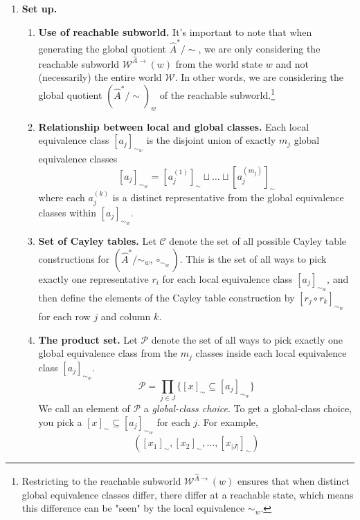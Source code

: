 \begin{proofE}
\begin{enumerate}[(1)]
    \item \textbf{Set up.}
    \begin{enumerate}
        \item \textbf{Use of reachable subworld.}
        It's important to note that when generating the global quotient $\hat{A}^{*}/\sim$, we are only considering the reachable subworld $\mathscr{W}^{\hat{A}\to}(w)$ from the world state $w$ and not (necessarily) the entire world $\mathscr{W}$.
        In other words, we are considering the global quotient $(\hat{A}^{*}/\sim)_{w}$ of the reachable subworld.\footnote{
        Restricting to the reachable subworld $\mathscr{W}^{\hat{A}\to}(w)$ ensures that when distinct global equivalence classes differ, there differ at a reachable state, which means this difference can be "seen" by the local equivalence $\sim_{w}$.
        }

        \item \textbf{Relationship between local and global classes.}
        Each local equivalence class $[a_{j}]_{\sim_{w}}$ is the disjoint union of exactly $m_{j}$ global equivalence classes
        \begin{equation}\label{eqn:local_class_is_disjoint_union_of_global_classes}
            [a_{j}]_{\sim_{w}} = [a_{j}^{(1)}]_{\sim} \sqcup \dots \sqcup [a_{j}^{(m_{j})}]_{\sim}
        \end{equation}
        where each $a_{j}^{(k)}$ is a distinct representative from the global equivalence classes within $[a_{j}]_{\sim_{w}}$.
    
        \item \textbf{Set of Cayley tables.}
        Let $\mathcal{C}$ denote the set of all possible Cayley table constructions for $(\hat{A}^{*}/\sim_{w}, \circ_{\sim_{w}})$.
        This is the set of all ways to pick exactly one representative $r_{i}$ for each local equivalence class $[a_{j}]_{\sim_{w}}$, and then define the elements of the Cayley table construction by $[r_{j} \circ r_{k}]_{\sim_{w}}$ for each row $j$ and column $k$.

        \item \textbf{The product set.}
        Let $\mathcal{P}$ denote the set of all ways to pick exactly one global equivalence class from the $m_{j}$ classes inside each local equivalence class $[a_{j}]_{\sim_{w}}$.
        \begin{equation}
            \mathcal{P} = \prod_{j \in J} \{ [x]_{\sim} \subseteq [a_{j}]_{\sim_{w}} \}
        \end{equation}
        We call an element of $\mathcal{P}$ a \emph{global-class choice}.
        To get a global-class choice, you pick a $[x]_{\sim} \subseteq [a_{j}]_{\sim_{w}}$ for each $j$.
        For example,
        \begin{equation}
            ([x_{1}]_{\sim}, [x_{2}]_{\sim}, \dots , [x_{|J|}]_{\sim})
        \end{equation}


\end{enumerate}
\end{enumerate}
\end{proofE}
